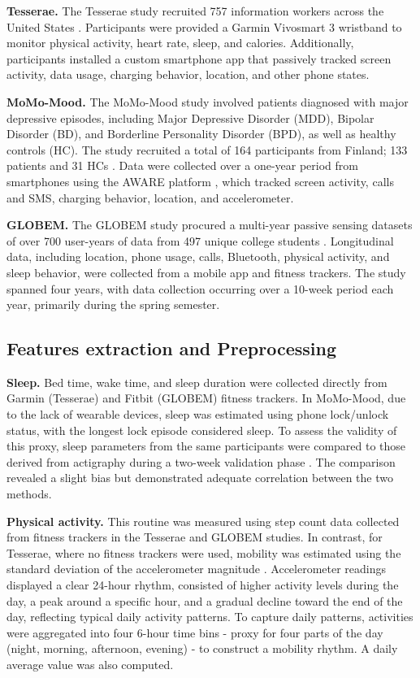 \documentclass[pdflatex,sn-vancouver,Numbered]{bst/sn-jnl}%
\theoremstyle{thmstyleone}%
\theoremstyle{thmstyletwo}%
\theoremstyle{thmstylethree}%
\begin{document}
\textbf{Tesserae.} The Tesserae study recruited 757 information workers across the United States \cite{mattingly2019tesserae}. Participants were provided a Garmin Vivosmart 3 wristband to monitor physical activity, heart rate, sleep, and calories. Additionally, participants installed a custom smartphone app that passively tracked screen activity, data usage, charging behavior, location, and other phone states.

\textbf{MoMo-Mood.} The MoMo-Mood study involved patients diagnosed with major depressive episodes, including Major Depressive Disorder (MDD), Bipolar Disorder (BD), and Borderline Personality Disorder (BPD), as well as healthy controls (HC). The study recruited a total of 164 participants from Finland; 133 patients and 31 HCs \cite{aledavood2025multimodal}. Data were collected over a one-year period from smartphones using the AWARE platform \cite{ferreiraAWAREMobileContext2015}, which tracked screen activity, calls and SMS, charging behavior, location, and accelerometer.

\textbf{GLOBEM.} The GLOBEM study procured a multi-year passive sensing datasets of over 700 user-years of data from 497 unique college students \cite{xu2022globem}. Longitudinal data, including location, phone usage, calls, Bluetooth, physical activity, and sleep behavior, were collected from a mobile app and fitness trackers. The study spanned four years, with data collection occurring over a 10-week period each year, primarily during the spring semester. 

\subsection*{Features extraction and Preprocessing} \label{sec:methods:features_extraction}  

\textbf{Sleep.} Bed time, wake time, and sleep duration were collected directly from Garmin (Tesserae) and Fitbit (GLOBEM) fitness trackers. In MoMo-Mood, due to the lack of wearable devices, sleep was estimated using phone lock/unlock status, with the longest lock episode considered sleep. To assess the validity of this proxy, sleep parameters from the same participants were compared to those derived from actigraphy during a two-week validation phase . The comparison revealed a slight bias but demonstrated adequate correlation between the two methods.

\textbf{Physical activity.} This routine was measured using step count data collected from fitness trackers in the Tesserae and GLOBEM studies. In contrast, for Tesserae, where no fitness trackers were used, mobility was estimated using the standard deviation of the accelerometer magnitude \cite{ravi2005activity}. Accelerometer readings displayed a clear 24-hour rhythm, consisted of higher activity levels during the day, a peak around a specific hour, and a gradual decline toward the end of the day, reflecting typical daily activity patterns. To capture daily patterns, activities were aggregated into four 6-hour time bins - proxy for four parts of the day (night, morning, afternoon, evening) - to construct a mobility rhythm. A daily average value was also computed.
\end{document}
